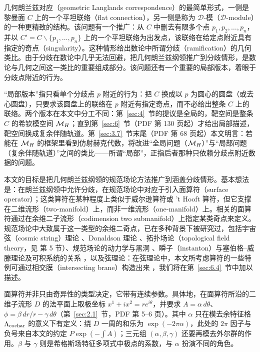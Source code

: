 几何朗兰兹对应（geometric Langlands correspondence）的最简单形式，一侧是黎曼面 $C$ 上的一个平坦联络（flat connection），另一侧是称为 ${\mathcal D}$-模（${\mathcal D}$-module）的一种更精致的结构。该问题有一个推广：从 $C$ 中删去有限多个点 $p_1,p_2,\dots,p_n$，并以 $C'=C\backslash\{p_1,\dots,p_n\}$ 上的一个平坦联络为出发点，该联络在给定点附近具有指定的奇点（singularity）。这种情形给出数论中所谓分歧（ramification）的几何类比。由于分歧在数论中几乎无法回避，把几何朗兰兹纲领推广到分歧情形，是数论与几何之间这一类比的重要组成部分。该问题还有一个重要的局部版本，着眼于分歧点附近的行为。

\begin{yizhu}[含糊点拨]
“局部版本”指只看单个分歧点 $p$ 附近的行为：把 $C$ 换成以 $p$ 为圆心的圆盘（或去心圆盘），只要求该圆盘上的联络在 $p$ 附近有指定奇点，而不必给出整条 $C$ 上的联络。两个版本在本文中分工不同：第~\ref{sec:4}~节的提议是全局的，靶空间是整条 $C$ 的希钦模空间 ${{\mathcal{M}}_H}$；直到第~\ref{sec:6}~节（PDF 第 130 页起）才给出局部描述，靶空间换成复余伴随轨道。第~\ref{sec:3.7}~节末尾（PDF 第 68 页起）本文明言：若能在 ${{\mathcal{M}}_H}$ 的框架里看到仿射赫克代数，将改进“全局问题（${{\mathcal{M}}_H}$）”与“局部问题（复余伴随轨道）”之间的类比——所谓“局部”，正指后者那种只依赖分歧点附近数据的问题。
\end{yizhu}

本文的目标是把几何朗兰兹纲领的规范场论方法推广到涵盖分歧情形。基本想法是：在朗兰兹纲领中允许分歧，在规范场论中对应于引入面算符（surface operator）；这类算符在某种程度上类似于威尔逊算符或 't Hooft 算符，但它支撑在二维流形（two-manifold）上，而非一维流形（one-manifold）上。相关的面算符通过在余维二子流形（codimension two submanifold）上指定某类奇点来定义。规范场论中大致属于这一类型的余维二奇点，已在多种背景下被研究过，包括宇宙弦（cosmic string）理论 \cite{ref10}、Donaldson 理论 \cite{ref11}、拓扑场论（topological field theory，见 \cite{ref12} 第 5 节）、规范场论的动力学与黑洞 \cite{ref13,ref14,ref15}、瞬子（instanton）与塞伯格--威滕理论及可积系统的关系 \cite{ref16,ref17}，以及弦理论：在弦理论中，本文所考虑算符的一些特例可通过相交膜（intersecting brane）构造出来 \cite{ref18}，我们将在第~\ref{sec:6.4}~节中加以描述。

\begin{yizhu}[易错点]
面算符并非只由奇异性的类型决定，它带有连续参数。具体地，在面算符所沿的二维子流形 $D$ 的法平面上取极坐标 $x^1+ix^2=re^{i\theta}$，并要求 $A=\alpha\,d\theta$、$\phi=\beta\,dr/r-\gamma\,d\theta$（第~\ref{sec:2.1}~节，PDF 第 5--6 页）。其中 $\alpha$ 只在模去余特征格 $\Lambda_{\rm cochar}$ 的意义下有定义：绕 $D$ 一周的和乐为 $\exp(-2\pi\alpha)$，此处的 $2\pi$ 因子与负号来自本文的约定 $P\exp(-\int A)$；三元组 $(\alpha,\beta,\gamma)$ 还要再模去外尔群的作用。$\beta$ 与 $\gamma$ 则是希格斯场特征多项式中极点的系数，与 $\alpha$ 扮演不同的角色。
\end{yizhu}


